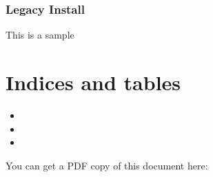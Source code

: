 \documentclass[letterpaper,10pt,english]{sphinxmanual}
\begin{document}
\subsection{Legacy Install}
\label{\detokenize{legacy/legacy-install:legacy-install}}\label{\detokenize{legacy/legacy-install::doc}}
\sphinxAtStartPar
This is a sample


\chapter{Indices and tables}
\label{\detokenize{index:indices-and-tables}}\begin{itemize}
\item {} 
\sphinxAtStartPar
{}

\item {} 
\sphinxAtStartPar
{}

\item {} 
\sphinxAtStartPar
{}

\end{itemize}

\sphinxAtStartPar
You can get a PDF copy of this document here: 



\renewcommand{\indexname}{Index}
\printindex
\end{document}
